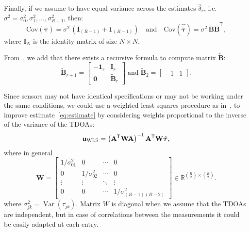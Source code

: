 \noindent
Finally, if we assume to have equal variance across the estimates \(\hat{\delta}_{r}\), i.e. \(\sigma^2=\sigma^2_0,\sigma^2_1,\ldots,\sigma^2_{R-1}\), then:
\begin{equation}
\text{Cov}(\boldsymbol{\hat{\tau}})=\sigma^2 \,\left(\mathbf{I}_{(R-1)}+\mathbf{1}_{(R-1)}\right)
\quad
\text{and}
\quad
\text{Cov}(\hat{\boldsymbol{\tilde{\tau}}})=\sigma^2 \,\tilde{\mathbf{B}}\tilde{\mathbf{B}}^\mathsf{T},
\end{equation}
where \(\mathbf{I}_{N}\) is the identity matrix of size \(N\times N\).

\noindent
From~\cite{Least-squares-range}, we add that there exists a recursive formula to compute matrix \(\tilde{\mathbf{B}}\):
\begin{equation}
\tilde{\mathbf{B}}_{r+1}=\left[\begin{array}{cc}
-\mathbf{1}_r & \mathbf{I}_r \\
\mathbf{0} & \tilde{\mathbf{B}}_r
\end{array}\right]
\; \text{and} \;
\tilde{\mathbf{B}}_2=\left[\begin{array}{ll}
-1 & 1
\end{array}\right].
\end{equation}


\noindent
Since sensors may not have identical specifications or may not be working under the same conditions, we could use a weighted least squares procedure as in~\cite{passive_localization}, to improve estimate~\eqref{eq:estimate} by considering weights proportional to the inverse of the variance of the TDOAs:
\begin{equation}
\mathbf{u}_{\mathrm{WLS}}=\left({\mathbf{A}}^{\mathsf{T}} \mathbf{W} \mathbf{A}\right)^{-1} {\mathbf{A}}^{\mathsf{T}} \mathbf{W}\hat{\boldsymbol{\tau}},
\end{equation}
where in general
\begin{equation}
\mathbf{W}=
\left[\begin{array}{cccc}
1/\sigma_{01}^2 & 0 & \cdots & 0 \\
0 & 1/\sigma_{02}^2 & \cdots & 0 \\
\vdots & \vdots & \ddots & \vdots \\
0 & 0 & \cdots & 1/\sigma_{(R-1)(R-2)}^2
\end{array}\right]\in\mathbb{R}^{\binom{R}{2}\times\binom{R}{2}}.
\end{equation}
where \(\sigma_{jk}^2=\operatorname{Var}(\tau_{jk})\). Matrix \(W\) is diagonal when we assume that the TDOAs are independent, but in case of correlations between the measurements it could be easily adapted at each entry.


